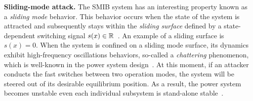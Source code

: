 \vspace{0.5em}
\noindent
{\bf Sliding-mode attack.} The SMIB system has an interesting property known as a \emph{sliding mode} behavior. This behavior occurs when the state of the system is attracted and subsequently stays within the \emph{sliding surface} defined by a state-dependent switching signal $s(x)\in\mathbb{R}$~\cite{decarlo1988variable, liu2014coordinated}. An example of a sliding surface is $s(x) = 0$. When the system is confined on a sliding mode surface, its dynamics exhibit high-frequency oscillations behaviors, so-called a \emph{chattering} phenomenon, which is well-known in the power system design~\cite{sabanovic2004variable}. At this moment, if an attacker conducts the fast switches between two operation modes, the system will be steered out of its desirable equilibrium position. As a result, the power system becomes unstable even each individual subsystem is stand-alone stable~\cite{liu2014coordinated}.
%
%
%

